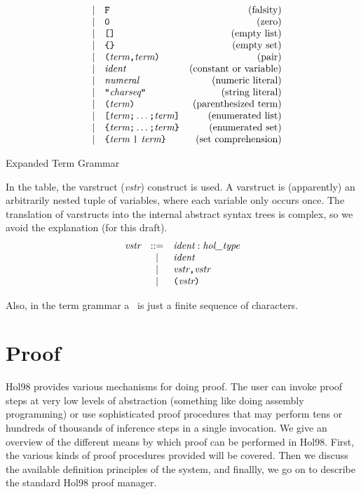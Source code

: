 \begin{table}
\[\begin{array}{rclr}
  & | & \verb+F+ & \mbox{(falsity)} \\
  & | & \verb+0+ & \mbox{(zero)} \\
  & | & \verb+[]+ & \mbox{(empty list)} \\
  & | & \verb+{}+ & \mbox{(empty set)} \\
  & | & \verb+(+ \term \verb+,+ \term \verb+)+ & \mbox{(pair)} \\
  & | & \ident & \mbox{(constant or variable)} \\
  & | & \numeral & \mbox{(numeric literal)} \\
  & | & \verb+"+\charseq \verb+"+& \mbox{(string literal)} \\
  & | & \verb+(+ \term \verb+)+ & \mbox{(parenthesized term)} \\ 
  & | & \verb+[+ \term \verb+;+ \ldots \verb+;+ \term \verb+]+ &
 \mbox{(enumerated list)} \\ 
  & | & \verb+{+ \term \verb+;+ \ldots \verb+;+ \term \verb+}+ &
 \mbox{(enumerated set)} \\
  & | & \verb+{+ \term \ \verb+|+\  \term \verb+}+ & \mbox{(set comprehension)}
 \end{array}
 \]
 \caption{Expanded Term Grammar} \label{expanded-grammar}
 \end{table}

 In the table, the varstruct ({\it vstr\/}) construct is used. A
 varstruct is (apparently) an arbitrarily nested tuple of variables, where
 each variable only occurs once. The translation of varstructs into the
 internal abstract syntax trees is complex, so we avoid 
 the explanation (for this draft).
 \[
 \begin{array}{rcl}
  \vstr & ::= & \ident : \type \\
  & | & \ident  \\
  & | & \vstr \verb+,+ \vstr \\
  & | & \verb+(+ \vstr \verb+)+
 \end{array}
 \]

\noindent Also, in the term grammar a \charseq\ is just a finite sequence of
 characters. 


\chapter{Proof}

 Hol98 provides various mechanisms for doing proof. The user can invoke
 proof steps at very low levels of abstraction (something like doing
 assembly programming) or use sophisticated proof procedures that may
 perform tens or hundreds of thousands of inference steps in a single
 invocation. We give an overview of the different means by which proof
 can be performed in Hol98. First, the various kinds of proof procedures
 provided will be covered. Then we discuss the available definition
 principles of the system, and finallly, we go on to describe the
 standard Hol98 proof manager.

